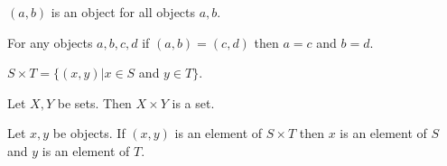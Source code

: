 \documentclass[11pt]{article}
\begin{document}
\begin{forthel}

\begin{axiom}
$(a,b)$ is an object for all objects $a,b$.
\end{axiom}

\begin{axiom}
For any objects $a,b,c,d$ if $(a,b) = (c,d)$ then $a = c$
and $b = d$.
\end{axiom}

\begin{definition}
$S \times T = \{(x,y) | x \in S$ and $y \in T\}$.
\end{definition}

\begin{axiom} Let $X,Y$ be sets. Then
$X \times Y$ is a set.
\end{axiom}

\begin{axiom}
Let $x,y$ be objects.
If $(x,y)$ is an element of $S \times T$ then $x$ is an
element of $S$ and $y$ is an element of $T$.
\end{axiom}

\end{forthel}
\end{document}
